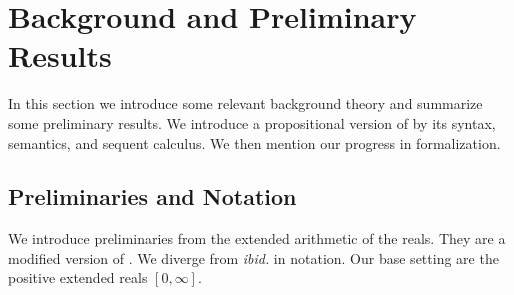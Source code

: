 \section{Background and Preliminary Results} \label{section:CurrentApproach}

In this section we introduce some relevant background theory and summarize some preliminary results. We introduce a propositional version of \OL{} by its syntax, semantics, and sequent calculus. We then mention our progress in formalization.

\subsection{Preliminaries and Notation}
\label{Preliminaries}
We introduce preliminaries from the extended arithmetic of the reals. They are a modified version of \cite{capucci2024quantifiers}. We diverge from \emph{ibid.} in notation. Our base setting are the positive extended reals $[0,\infty]$. %

